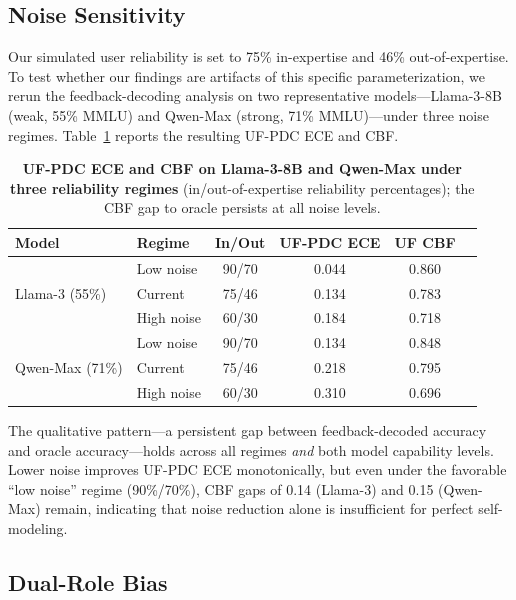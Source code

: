 \documentclass[11pt]{article}
\begin{document}
\subsection{Noise Sensitivity}
\label{app:noise}

Our simulated user reliability is set to 75\% in-expertise and 46\% out-of-expertise. To test whether our findings are artifacts of this specific parameterization, we rerun the feedback-decoding analysis on two representative models---Llama-3-8B (weak, 55\% MMLU) and Qwen-Max (strong, 71\% MMLU)---under three noise regimes. Table~\ref{tab:noise_sens} reports the resulting UF-PDC ECE and CBF.

\begin{table}[h]
\centering
\small
\caption{\textbf{UF-PDC ECE and CBF on Llama-3-8B and Qwen-Max under three reliability regimes} (in/out-of-expertise reliability percentages); the CBF gap to oracle persists at all noise levels.}
\label{tab:noise_sens}
\begin{tabular}{llcccc}
\toprule
\textbf{Model} & \textbf{Regime} & \textbf{In/Out} & \textbf{UF-PDC ECE} & \textbf{UF CBF} \\
\midrule
\multirow{3}{*}{Llama-3 (55\%)}
 & Low noise    & 90/70 & 0.044 & 0.860 \\
 & Current      & 75/46 & 0.134 & 0.783 \\
 & High noise   & 60/30 & 0.184 & 0.718 \\
\midrule
\multirow{3}{*}{Qwen-Max (71\%)}
 & Low noise    & 90/70 & 0.134 & 0.848 \\
 & Current      & 75/46 & 0.218 & 0.795 \\
 & High noise   & 60/30 & 0.310 & 0.696 \\
\bottomrule
\end{tabular}
\end{table}

The qualitative pattern---a persistent gap between feedback-decoded accuracy and oracle accuracy---holds across all regimes \emph{and} both model capability levels. Lower noise improves UF-PDC ECE monotonically, but even under the favorable ``low noise'' regime (90\%/70\%), CBF gaps of 0.14 (Llama-3) and 0.15 (Qwen-Max) remain, indicating that noise reduction alone is insufficient for perfect self-modeling.



\subsection{Dual-Role Bias}
\label{app:dual_role}
\end{document}
